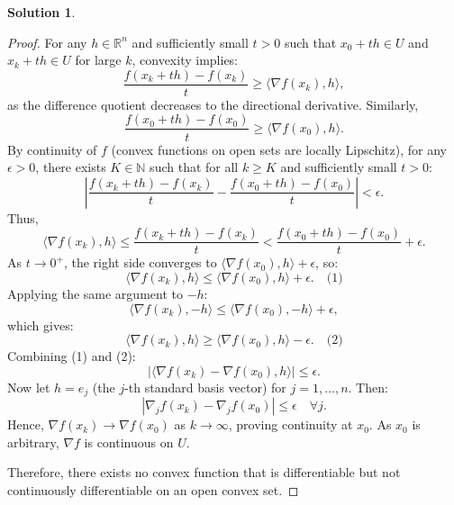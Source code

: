 \documentclass[12pt]{article}
\theoremstyle{definition}
\newtheorem*{solution}{\normalfont\textbf{Solution}}
\begin{document}
\begin{enumerate}[leftmargin=*]
\begin{solution}
\begin{proof}
                For any \( h \in \mathbb{R}^n \) and sufficiently small \( t > 0 \) such that \( x_0 + th \in U \) and \( x_k + th \in U \) for large \( k \), convexity implies:
                \[
                \frac{f(x_k + th) - f(x_k)}{t} \geq \langle \nabla f(x_k), h \rangle,
                \]
                as the difference quotient decreases to the directional derivative. Similarly,
                \[
                \frac{f(x_0 + th) - f(x_0)}{t} \geq \langle \nabla f(x_0), h \rangle.
                \]
                By continuity of \( f \) (convex functions on open sets are locally Lipschitz), for any \( \epsilon > 0 \), there exists \( K \in \mathbb{N} \) such that for all \( k \geq K \) and sufficiently small \( t > 0 \):
                \[
                \left| \frac{f(x_k + th) - f(x_k)}{t} - \frac{f(x_0 + th) - f(x_0)}{t} \right| < \epsilon.
                \]
                Thus,
                \[
                \langle \nabla f(x_k), h \rangle \leq \frac{f(x_k + th) - f(x_k)}{t} < \frac{f(x_0 + th) - f(x_0)}{t} + \epsilon.
                \]
                As \( t \rightarrow 0^{+} \), the right side converges to \( \langle \nabla f(x_0), h \rangle + \epsilon \), so:
                \[
                \langle \nabla f(x_k), h \rangle \leq \langle \nabla f(x_0), h \rangle + \epsilon. \quad \text{(1)}
                \]
                Applying the same argument to \( -h \):
                \[
                \langle \nabla f(x_k), -h \rangle \leq \langle \nabla f(x_0), -h \rangle + \epsilon,
                \]
                which gives:
                \[
                \langle \nabla f(x_k), h \rangle \geq \langle \nabla f(x_0), h \rangle - \epsilon. \quad \text{(2)}
                \]
                Combining (1) and (2):
                \[
                |\langle \nabla f(x_k) - \nabla f(x_0), h \rangle| \leq \epsilon.
                \]
                Now let \( h = e_j \) (the \( j\)-th standard basis vector) for \( j = 1, \dots, n \). Then:
                \[
                |\nabla_j f(x_k) - \nabla_j f(x_0)| \leq \epsilon \quad \forall j.
                \]
                Hence, \( \nabla f(x_k) \to \nabla f(x_0) \) as \( k \to \infty \), proving continuity at \( x_0 \). As \( x_0 \) is arbitrary, \( \nabla f \) is continuous on \( U \).

                Therefore, there exists no convex function that is differentiable but not continuously differentiable on an open convex set.
            \end{proof}
        \end{solution}
    

\end{enumerate}
\end{document}
